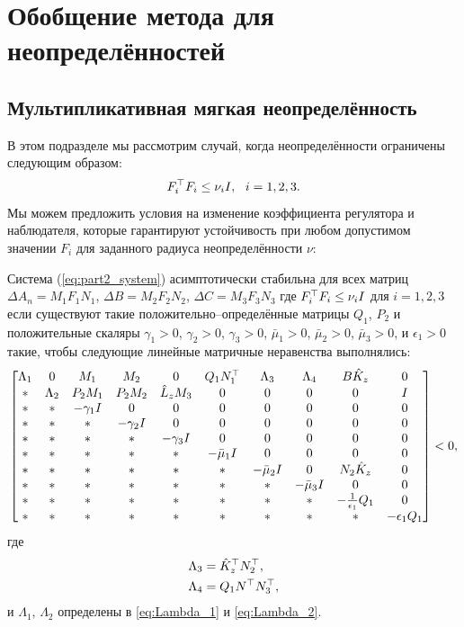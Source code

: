 \chapter{Обобщение метода для неопределённостей}\label{ch:ch4}
\section{Мультипликативная мягкая неопределённость}\label{sec:ch4/sect1}

В этом подразделе мы рассмотрим случай, когда неопределённости ограничены следующим образом:
%
\begin{equation}
	\label{eq:part2_nu_uncertainty}
	{F}_i^\top{F}_i\leq \nu_i {I}, \ \ i=1,2,3.
\end{equation}
%
Мы можем предложить условия на изменение коэффициента регулятора и наблюдателя, которые гарантируют устойчивость при любом допустимом значении ${F}_i$ для заданного радиуса неопределённости $\nu$:
\begin{theorem}\label{thm:part2_LMI_2}
	Система (\ref{eq:part2_system}) асимптотически стабильна для всех матриц
	$\Delta {A}_n={M}_1{F}_1{N}_1$, 
	$\Delta {B}= {M}_2{F}_2{N}_2$, 
	$\Delta {C} = {M}_3{F}_3{N}_3$
	где
	${F}_i^\top{F}_i\leq \nu_i {I}$ для $i=1,2,3$
	если существуют такие положительно--определённые матрицы ${Q}_1$, ${P}_2$ и положительные скаляры
	$\gamma_1>0$, $\gamma_2>0$, $\gamma_3>0$, $\bar{\mu}_1>0$, $\bar{\mu}_2>0$, $\bar{\mu}_3>0$, и $\epsilon_1 > 0$ такие, чтобы следующие линейные матричные неравенства выполнялись:
	\begin{equation}
		\label{eq:thm4_final_LMI}
		\begin{bmatrix}
			{\Lambda}_1 & 0 & {M}_1 & {M}_2&0 & {Q}_1{N}_1^\top & {\Lambda}_3 &{\Lambda}_4 & {B}\hat{{K}}_z & 0\\
			* & {\Lambda}_2 & {P}_2{M}_1 & {P}_2{M}_2 & \hat{{L}}_z{M}_3& 0& 0&0&0&{I} \\
			* & * & -\gamma_1{I} & 0&0&0&0&0&0&0\\
			* & * &*  & -\gamma_2{I}&0&0&0&0&0&0\\
			*& * & * &*  & -\gamma_3{I}&0&0&0&0&0\\
			* &* & * & * & *&-\bar{\mu}_1{I}&0&0&0&0\\
			* & * & * &*& *&*&-\bar{\mu}_2{I}& 0&{N}_2\hat{{K}}_z&0\\
			*&*&* &* & * & * & *&-\bar{\mu}_3{I}&0&0\\
			* & * & *&*&* & *&*&*&-\frac{1}{\epsilon_1}{Q}_1&0\\
			* & * & * & *&*&*&*&*&*&-\epsilon_1{Q}_1\\
		\end{bmatrix}<0,
	\end{equation}
	где
	\begin{align}
		{\Lambda}_3&=\hat{{K}}_z^\top{N}_2^\top,\\ {\Lambda}_4&={Q}_1{N}^\top{N}_3^\top,
	\end{align}
	и ${\Lambda}_1$, ${\Lambda}_2$ определены в \eqref{eq:Lambda_1} и \eqref{eq:Lambda_2}. 
\end{theorem}
